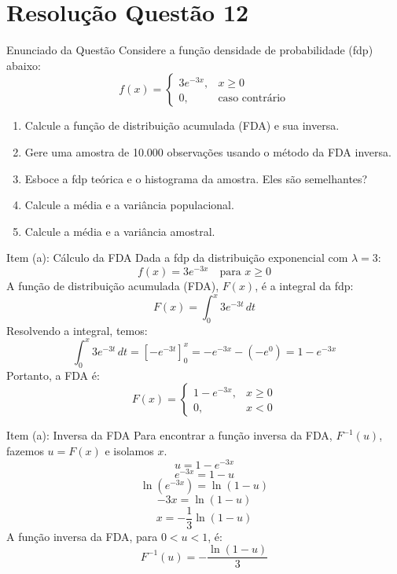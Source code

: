 \section{Resolução Questão 12}

\begin{frame}[fragile]{Enunciado da Questão}
    Considere a função densidade de probabilidade (fdp) abaixo:
\[
f(x) =
\begin{cases}
3e^{-3x}, & x \geq 0 \\
0, & \text{caso contrário}
\end{cases}
\]

\begin{enumerate}
    \item[(a)] Calcule a função de distribuição acumulada (FDA) e sua inversa.
    \item[(b)] Gere uma amostra de 10.000 observações usando o método da FDA inversa.
    \item[(c)] Esboce a fdp teórica e o histograma da amostra. Eles são semelhantes?
    \item[(d)] Calcule a média e a variância populacional.
    \item[(e)] Calcule a média e a variância amostral.
\end{enumerate}
\end{frame}

\begin{frame}{Item (a): Cálculo da FDA}
Dada a fdp da distribuição exponencial com $\lambda = 3$:
\[
f(x) = 3e^{-3x} \quad \text{para } x \geq 0
\]
A função de distribuição acumulada (FDA), $F(x)$, é a integral da fdp:
\[
F(x) = \int_{0}^{x} 3e^{-3t} \, dt
\]
Resolvendo a integral, temos:
\[
\int_{0}^{x} 3e^{-3t} \, dt = \left[ -e^{-3t} \right]_{0}^{x} = -e^{-3x} - (-e^0) = 1 - e^{-3x}
\]
Portanto, a FDA é:
\[
F(x) =
\begin{cases}
1 - e^{-3x}, & x \geq 0 \\
0, & x < 0
\end{cases}
\]
\end{frame}

\begin{frame}{Item (a): Inversa da FDA}
Para encontrar a função inversa da FDA, $F^{-1}(u)$, fazemos $u = F(x)$ e isolamos $x$.
\[
u = 1 - e^{-3x}
\]
\[
e^{-3x} = 1 - u
\]
\[
\ln(e^{-3x}) = \ln(1 - u)
\]
\[
-3x = \ln(1 - u)
\]
\[
x = -\frac{1}{3} \ln(1 - u)
\]
A função inversa da FDA, para $0 < u < 1$, é:
\[
F^{-1}(u) = -\frac{\ln(1 - u)}{3}
\]
\end{frame}

